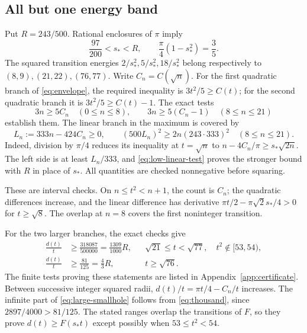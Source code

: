 \documentclass[11pt,reqno]{amsart}
\numberwithin{equation}{section}
\newcommand{\sstar}{s_*}
\begin{document}
\subsection*{All but one energy band}

Put $R=243/500$. Rational enclosures of $\pi$ imply
\begin{equation}\label{eq:sstar-bracket}
 \frac{97}{200}<\sstar<R,
 \qquad \frac\pi4(1-\sstar^2)=\frac35.
\end{equation}
The squared transition energies
$2/\sstar^2,5/\sstar^2,18/\sstar^2$ belong respectively to
$(8,9),(21,22),(76,77)$. Write $C_n=C(\sqrt n)$.
For the first quadratic branch of \eqref{eq:envelope}, the
required inequality is $3t^2/5\ge C(t)$; for the second
quadratic branch it is $3t^2/5\ge C(t)-1$. The exact tests
\begin{equation}\label{eq:low-tests}
 3n\ge5C_n\quad(0\le n\le8),\qquad
 3n\ge5(C_n-1)\quad(8\le n\le21)
\end{equation}
establish them. The linear branch in the maximum is covered by
\begin{equation}\label{eq:low-linear-test}
 L_n:=333n-424C_n\ge0,
 \qquad(500L_n)^2\ge2n(243\cdot333)^2
 \quad(8\le n\le21).
\end{equation}
Indeed, division by $\pi/4$ reduces its inequality at $t=\sqrt n$
to $n-4C_n/\pi\ge\sstar\sqrt{2n}$. The left side is at
least $L_n/333$, and \eqref{eq:low-linear-test} proves the
stronger bound with $R$ in place of $\sstar$. All quantities
are checked nonnegative before squaring.

These are interval checks. On $n\le t^2<n+1$, the count is
$C_n$; the quadratic differences increase, and the linear
difference has derivative $\pi t/2-\pi\sqrt2\sstar/4>0$
for $t\ge\sqrt8$. The overlap at $n=8$ covers the first
noninteger transition.

For the two larger branches, the exact checks give
\begin{align}
 \frac{d(t)}t&\ge\frac{318087}{500000}
       =\frac{1309}{1000}R,
 &&\sqrt{21}\le t<\sqrt{77},\quad t^2\notin[53,54),
 \label{eq:middle-smallhole}\\
 \frac{d(t)}t&\ge\frac{81}{125}=\frac43R,
 &&t\ge\sqrt{76}.\label{eq:large-smallhole}
\end{align}
The finite tests proving these statements are listed in
Appendix~\ref{app:certificate}. Between successive integer
squared radii, $d(t)/t=\pi t/4-C_n/t$ increases. The infinite
part of \eqref{eq:large-smallhole} follows from
\eqref{eq:thousand}, since $2897/4000>81/125$.
The stated ranges overlap the transitions of $F$, so they
prove $d(t)\ge F(\sstar t)$ except possibly when
$53\le t^2<54$.
\end{document}
